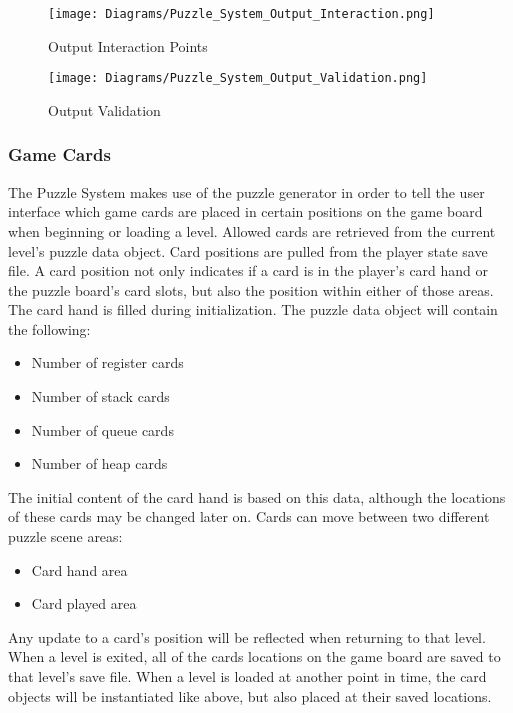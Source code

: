 \begin{figure}[!hb]
  \caption{Output Interaction Points}
  \label{fig:Puzzle_System_Output_Interaction}
  \centering
  \texttt{[image: Diagrams/Puzzle\_System\_Output\_Interaction.png]}
\end{figure}

\begin{figure}[!hb]
  \caption{Output Validation}
  \label{fig:Puzzle_System_Output_Validation}
  \centering
  \texttt{[image: Diagrams/Puzzle\_System\_Output\_Validation.png]}
\end{figure}
\vfill
\clearpage

\subsubsection{Game Cards}
The Puzzle System makes use of the puzzle generator in order to tell the user interface
which game cards are placed in certain positions on the game board when beginning
or loading a level. Allowed cards are retrieved from the current level's puzzle data object.
Card positions are pulled from the player state save file.
A card position not only indicates if a card is in the player's card hand or the puzzle board's
card slots, but also the position within either of those areas.\\

The card hand is filled during initialization. The puzzle data object will contain the following:
\begin{itemize}
   \item Number of register cards
   \item Number of stack cards
   \item Number of queue cards
   \item Number of heap cards
\end{itemize}

The initial content of the card hand is based on this data, although the locations
of these cards may be changed later on. Cards can move between two different puzzle scene areas:
\begin{itemize}
   \item Card hand area
   \item Card played area
\end{itemize}

Any update to a card's position will be reflected when returning to that level.
When a level is exited, all of the cards locations on the game board are saved to
that level's save file. When a level is loaded at another point in time, the card
objects will be instantiated like above, but also placed at their saved locations.\\
\clearpage

